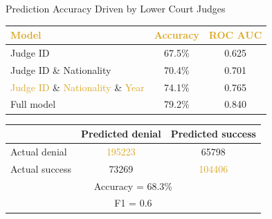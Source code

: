 \begin{frame}{Prediction Accuracy Driven by Lower Court Judges}

        \begin{table}[h!]
            \small
            \begin{center}
              \begin{tabular}{lcc}
                
                \textcolor{goldenrod}{\textbf{Model}} & \textcolor{goldenrod}{\textbf{Accuracy}}  & \textcolor{goldenrod}{\textbf{ROC AUC}} \\
                \hline
                Judge ID & 67.5\% & 0.625 \\
                Judge ID \& Nationality & 70.4\% & 0.701 \\
                \textcolor{goldenrod}{Judge ID} \& \textcolor{goldenrod}{Nationality} \& \textcolor{goldenrod}{Year} & 74.1\% & 0.765 \\
                \hline
                Full model & 79.2\% & 0.840
              \end{tabular}
            \end{center}
          \end{table}

        \begin{table}[h!]
            \small
            \begin{center}
              \begin{tabular}{lcc}
                
                 & Predicted denial & Predicted success  \\
                \hline
                Actual denial & \textcolor{goldenrod}{195223} & 65798\\
                Actual success & 73269 & \textcolor{goldenrod}{104406} \\
                \hline
                \multicolumn{3}{c}{Accuracy = 68.3\%}\\
                \multicolumn{3}{c}{F1 = 0.6}
              \end{tabular}
            \end{center}
          \end{table}
\end{frame}

